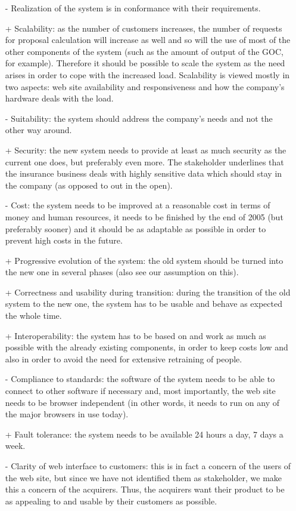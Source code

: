 \begin{itemize}
\item[-] Realization of the system is in conformance with their
requirements.
\item[+] Scalability: as the number of customers increases,
the number of requests for proposal calculation will increase as well
and so will the use of most of the other components of the system
(such as the amount of output of the GOC, for example). Therefore it
should be possible to scale the system as the need arises in order to
cope with the increased load. Scalability is viewed mostly in two aspects:
web site availability and responsiveness and how the company's hardware
deals with the load.
\item[-] Suitability: the system should address the company's needs
and not the other way around.
\item[+] Security: the new system needs to provide at least as much
security as the current one does, but preferably even more. The stakeholder
underlines that the insurance business deals with highly sensitive data
which should stay in the company (as opposed to out in the open).
\item[-] Cost: the system needs to be improved at a reasonable cost in
terms of money and human resources, it needs to be finished by the
end of 2005 (but preferably sooner) and it should be as adaptable as
possible in order to prevent high costs in the future.
\item[+] Progressive evolution of the system: the old system should be
turned into the new one in several phases (also see our assumption on this).
\item[+] Correctness and usability during transition: during the transition
of the old system to the new one, the system has to be usable and behave
as expected the whole time.
\item[+] Interoperability: the system has to be based on and work as much
as possible with the already existing components, in order to keep costs low
and also in order to avoid the need for extensive retraining of people.
\item[-] Compliance to standards: the software of the system needs to be able
to connect to other software if necessary and, most importantly, the web site
needs to be browser independent (in other words, it needs to run on any of the
major browsers in use today).
\item[+] Fault tolerance: the system needs to be available 24 hours a day, 7 days
a week.
\item[-] Clarity of web interface to customers: this is in fact a concern of the
users of the web site, but since we have not identified them as stakeholder,
we make this a concern of the acquirers. Thus, the acquirers want their product
to be as appealing to and usable by their customers as possible.
\end{itemize}

